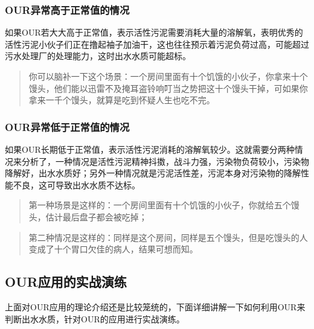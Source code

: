 \documentclass[
]{book}
\begin{document}
\hypertarget{ourux5f02ux5e38ux9ad8ux4e8eux6b63ux5e38ux503cux7684ux60c5ux51b5}{%
\subsubsection{OUR异常高于正常值的情况}\label{ourux5f02ux5e38ux9ad8ux4e8eux6b63ux5e38ux503cux7684ux60c5ux51b5}}

如果OUR若大大高于正常值，表示活性污泥需要消耗大量的溶解氧，表明优秀的活性污泥小伙子们正在撸起袖子加油干，这也往往预示着污泥负荷过高，可能超过污水处理厂的处理能力，这时出水水质可能超标。

\begin{quote}
你可以脑补一下这个场景：一个房间里面有十个饥饿的小伙子，你拿来十个馒头，他们能以迅雷不及掩耳盗铃响叮当之势把这十个馒头干掉，可如果你拿来一千个馒头，就算是吃到怀疑人生也吃不完。
\end{quote}

\hypertarget{ourux5f02ux5e38ux4f4eux4e8eux6b63ux5e38ux503cux7684ux60c5ux51b5}{%
\subsubsection{OUR异常低于正常值的情况}\label{ourux5f02ux5e38ux4f4eux4e8eux6b63ux5e38ux503cux7684ux60c5ux51b5}}

如果OUR长期低于正常值，表示活性污泥消耗的溶解氧较少。这就需要分两种情况来分析了，一种情况是活性污泥精神抖擞，战斗力强，污染物负荷较小，污染物降解好，出水水质好；另外一种情况就是污泥活性差，污泥本身对污染物的降解性能不良，这可导致出水水质不达标。

\begin{quote}
第一种场景是这样的：一个房间里面有十个饥饿的小伙子，你就给五个馒头，估计最后盘子都会被吃掉；
\end{quote}

\begin{quote}
第二种情况是这样的：同样是这个房间，同样是五个馒头，但是吃馒头的人变成了十个胃口欠佳的病人，结果可想而知。
\end{quote}

\hypertarget{ourux5e94ux7528ux7684ux5b9eux6218ux6f14ux7ec3}{%
\subsection{OUR应用的实战演练}\label{ourux5e94ux7528ux7684ux5b9eux6218ux6f14ux7ec3}}

上面对OUR应用的理论介绍还是比较笼统的，下面详细讲解一下如何利用OUR来判断出水水质，针对OUR的应用进行实战演练。
\end{document}
